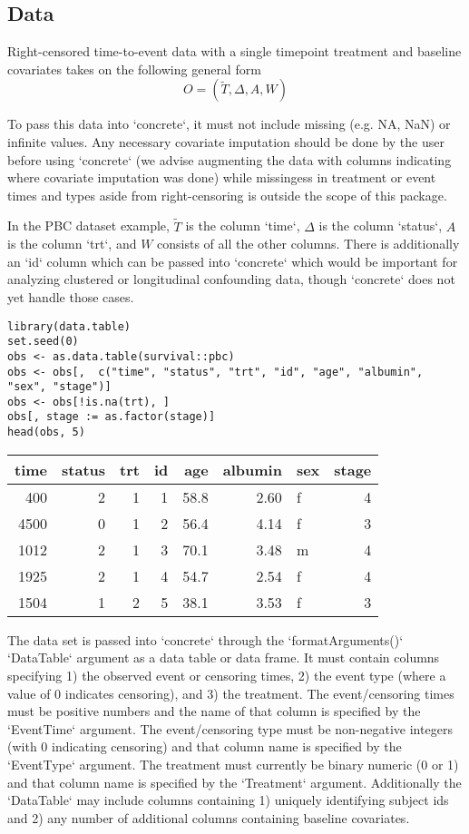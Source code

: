 \documentclass{report}
\newcommand{\1}{\ensuremath{\mathbf{1}}}
\newcommand{\T}{\ensuremath{\widetilde{T}}}
\renewcommand{\L}{\ensuremath{W}}
\begin{document}
\subsection{Data}
Right-censored time-to-event data with a single timepoint treatment and baseline covariates takes on the following general form
\[O = (\T, \Delta, A, \L) \]

To pass this data into `concrete`, it must not include missing (e.g. NA, NaN) or infinite values. Any necessary covariate imputation should be done by the user before using `concrete` (we advise augmenting the data with columns indicating where covariate imputation was done) while missingess in treatment or event times and types aside from right-censoring is outside the scope of this package.

In the PBC dataset example, \(\T\) is the column `time`, \(\Delta\) is the column `status`, \(A\) is the column `trt`, and \(\L\) consists of all the other columns. There is additionally an `id` column which can be passed into `concrete` which would be important for analyzing clustered or longitudinal confounding data, though `concrete` does not yet handle those cases. 

\begin{lstlisting}
library(data.table)
set.seed(0)
obs <- as.data.table(survival::pbc)
obs <- obs[,  c("time", "status", "trt", "id", "age", "albumin", "sex", "stage")]
obs <- obs[!is.na(trt), ]
obs[, stage := as.factor(stage)]
head(obs, 5)
\end{lstlisting}

\begin{center}
\begin{tabular}{rrrrrrlr}
time & status & trt & id & age & albumin & sex & stage\\
\hline
400 & 2 & 1 & 1 & 58.8 & 2.60 & f & 4\\
4500 & 0 & 1 & 2 & 56.4 & 4.14 & f & 3\\
1012 & 2 & 1 & 3 & 70.1 & 3.48 & m & 4\\
1925 & 2 & 1 & 4 & 54.7 & 2.54 & f & 4\\
1504 & 1 & 2 & 5 & 38.1 & 3.53 & f & 3\\
\end{tabular}
\end{center}

The data set is passed into `concrete` through the `formatArguments()` `DataTable` argument as a data table or data frame. It must contain columns specifying 1) the observed event or censoring times, 2) the event type (where a value of 0 indicates censoring), and 3) the treatment. The event/censoring times must be positive numbers and the name of that column is specified by the `EventTime` argument. The event/censoring type must be non-negative integers (with 0 indicating censoring) and that column name is specified by the `EventType` argument. The treatment must currently be binary numeric (0 or 1) and that column name is specified by the `Treatment` argument. Additionally the `DataTable` may include columns containing 1) uniquely identifying subject ids and 2) any number of additional columns containing baseline covariates.
\end{document}
